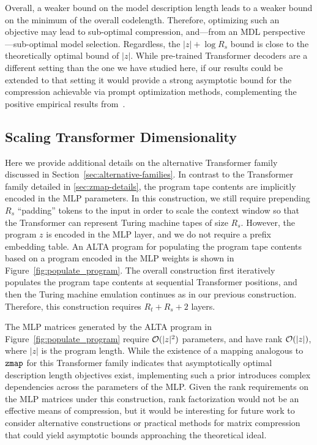 Overall, a weaker bound on the model description length leads to a weaker bound on the minimum of the overall codelength. Therefore, optimizing such an objective may lead to sub-optimal compression, and---from an MDL perspective---sub-optimal model selection. Regardless, the $|z| + \log R_s$ bound is close to the theoretically optimal bound of $|z|$. While pre-trained Transformer decoders are a different setting than the one we have studied here, if our results could be extended to that setting it would provide a strong asymptotic bound for the compression achievable via prompt optimization methods, complementing the positive empirical results from~\citet{akinwande2024understanding}.

\subsection{Scaling Transformer Dimensionality}
\label{sec:mlp-scaling}

Here we provide additional details on the alternative Transformer family discussed in Section~\ref{sec:alternative-families}. In contrast to the Transformer family detailed in \ref{sec:zmap-details}, the program tape contents are implicitly encoded in the MLP parameters. In this construction, we still require prepending $R_s$ ``padding'' tokens to the input in order to scale the context window so that the Transformer can represent Turing machine tapes of size $R_s$. However, the program $z$ is encoded in the MLP layer, and we do not require a prefix embedding table. An ALTA program for populating the program tape contents based on a program encoded in the MLP weights is shown in Figure~\ref{fig:populate_program}. The overall construction first iteratively populates the program tape contents at sequential Transformer positions, and then the Turing machine emulation continues as in our previous construction. Therefore, this construction requires $R_t + R_s + 2$ layers.



The MLP matrices generated by the ALTA program in Figure~\ref{fig:populate_program} require ${\mathcal{O}}(|z|^2)$ parameters, and have rank ${\mathcal{O}}(|z|)$, where $|z|$ is the program length. While the existence of a mapping analogous to $\texttt{zmap}$ for this Transformer family indicates that asymptotically optimal description length objectives exist, implementing such a prior introduces complex dependencies across the parameters of the MLP. Given the rank requirements on the MLP matrices under this construction, rank factorization would not be an effective means of compression, but it would be interesting for future work to consider alternative constructions or practical methods for matrix compression that could yield asymptotic bounds approaching the theoretical ideal.